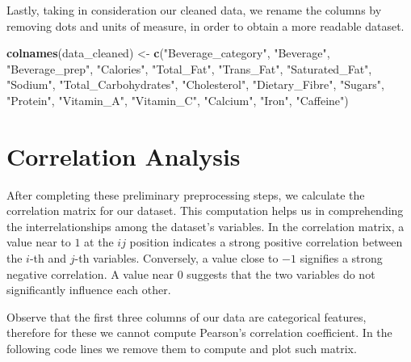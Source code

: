 \documentclass[
]{article}
\newenvironment{Shaded}{\begin{snugshade}}{\end{snugshade}}
\newcommand{\FunctionTok}[1]{\textcolor[rgb]{0.13,0.29,0.53}{\textbf{#1}}}
\newcommand{\NormalTok}[1]{#1}
\newcommand{\OtherTok}[1]{\textcolor[rgb]{0.56,0.35,0.01}{#1}}
\newcommand{\StringTok}[1]{\textcolor[rgb]{0.31,0.60,0.02}{#1}}
\begin{document}
Lastly, taking in consideration our cleaned data, we rename the columns
by removing dots and units of measure, in order to obtain a more
readable dataset.

\begin{Shaded}
\begin{Highlighting}[]
\FunctionTok{colnames}\NormalTok{(data\_cleaned) }\OtherTok{\textless{}{-}} \FunctionTok{c}\NormalTok{(}\StringTok{"Beverage\_category"}\NormalTok{, }\StringTok{"Beverage"}\NormalTok{,}
                            \StringTok{"Beverage\_prep"}\NormalTok{, }\StringTok{"Calories"}\NormalTok{,}
                            \StringTok{"Total\_Fat"}\NormalTok{, }\StringTok{"Trans\_Fat"}\NormalTok{,}
                            \StringTok{"Saturated\_Fat"}\NormalTok{, }\StringTok{"Sodium"}\NormalTok{,}
                            \StringTok{"Total\_Carbohydrates"}\NormalTok{, }\StringTok{"Cholesterol"}\NormalTok{,}
                            \StringTok{"Dietary\_Fibre"}\NormalTok{, }\StringTok{"Sugars"}\NormalTok{,}
                            \StringTok{"Protein"}\NormalTok{, }\StringTok{"Vitamin\_A"}\NormalTok{,}
                            \StringTok{"Vitamin\_C"}\NormalTok{, }\StringTok{"Calcium"}\NormalTok{,}
                            \StringTok{"Iron"}\NormalTok{, }\StringTok{"Caffeine"}\NormalTok{)}
\end{Highlighting}
\end{Shaded}

\section{Correlation Analysis}\label{correlation-analysis}

After completing these preliminary preprocessing steps, we calculate the
correlation matrix for our dataset. This computation helps us in
comprehending the interrelationships among the dataset's variables. In
the correlation matrix, a value near to \(1\) at the \(ij\) position
indicates a strong positive correlation between the \(i\)-th and
\(j\)-th variables. Conversely, a value close to \(-1\) signifies a
strong negative correlation. A value near \(0\) suggests that the two
variables do not significantly influence each other.

Observe that the first three columns of our data are categorical
features, therefore for these we cannot compute Pearson's correlation
coefficient. In the following code lines we remove them to compute and
plot such matrix.
\end{document}
